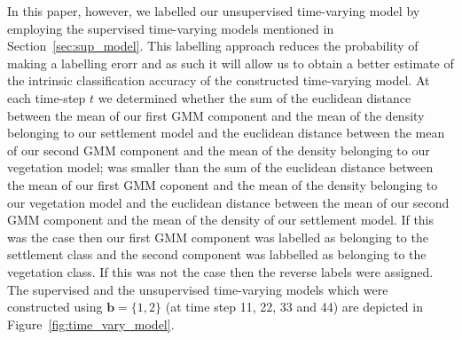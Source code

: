 \documentclass{article}
\begin{document}
In this paper, however, we labelled our unsupervised time-varying model by employing the supervised time-varying models mentioned in Section~\ref{sec:sup_model}. This labelling approach reduces the probability of making a labelling erorr and as such it will allow us to obtain a better estimate of the intrinsic classification accuracy of the constructed time-varying model. At each time-step $t$ we 
determined whether the sum of the euclidean distance between the mean of our first GMM component and the mean of the density belonging to our settlement model and the euclidean distance 
between the mean of our second GMM component and the mean of the density belonging to our vegetation model; was smaller than the sum of the euclidean distance between the mean of our first GMM coponent and the mean of the density 
belonging to our vegetation model and the euclidean distance between the mean of our second GMM component and the mean of the density of our settlement model. If this was the case then our first GMM component 
was labelled as belonging to the settlement class and the second component was labbelled as belonging to the vegetation class. If this was not the case then 
the reverse labels were assigned. The supervised and the unsupervised time-varying models which were constructed using $\mathbf{b}=\{1,2\}$ (at time step 11, 22, 33 and 44) are depicted in Figure~\ref{fig:time_vary_model}.

% 


\end{document}
